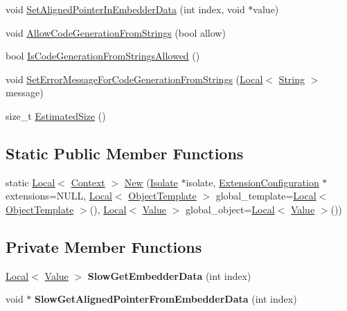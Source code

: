 \begin{DoxyCompactItemize}
void \hyperlink{classv8_1_1_context_a522063c88e4c2832f5ff4f3980815f58}{Set\+Aligned\+Pointer\+In\+Embedder\+Data} (int index, void $\ast$value)
\item 
void \hyperlink{classv8_1_1_context_a794ccc42113566f5d363f89c8b0d3c2c}{Allow\+Code\+Generation\+From\+Strings} (bool allow)
\item 
bool \hyperlink{classv8_1_1_context_aa7a960a232d232d1a2a904c2e6c18831}{Is\+Code\+Generation\+From\+Strings\+Allowed} ()
\item 
void \hyperlink{classv8_1_1_context_a8c919ccddb6fbb65602f7fe2587e8a34}{Set\+Error\+Message\+For\+Code\+Generation\+From\+Strings} (\hyperlink{classv8_1_1_local}{Local}$<$ \hyperlink{classv8_1_1_string}{String} $>$ message)
\item 
size\+\_\+t \hyperlink{classv8_1_1_context_abfec90cb6cb1cac58b4e3487515721a2}{Estimated\+Size} ()
\end{DoxyCompactItemize}
\subsection*{Static Public Member Functions}
\begin{DoxyCompactItemize}
\item 
static \hyperlink{classv8_1_1_local}{Local}$<$ \hyperlink{classv8_1_1_context}{Context} $>$ \hyperlink{classv8_1_1_context_a131c7bc130710ccbf739612868be6369}{New} (\hyperlink{classv8_1_1_isolate}{Isolate} $\ast$isolate, \hyperlink{classv8_1_1_extension_configuration}{Extension\+Configuration} $\ast$extensions=N\+U\+LL, \hyperlink{classv8_1_1_local}{Local}$<$ \hyperlink{classv8_1_1_object_template}{Object\+Template} $>$ global\+\_\+template=\hyperlink{classv8_1_1_local}{Local}$<$ \hyperlink{classv8_1_1_object_template}{Object\+Template} $>$(), \hyperlink{classv8_1_1_local}{Local}$<$ \hyperlink{classv8_1_1_value}{Value} $>$ global\+\_\+object=\hyperlink{classv8_1_1_local}{Local}$<$ \hyperlink{classv8_1_1_value}{Value} $>$())
\end{DoxyCompactItemize}
\subsection*{Private Member Functions}
\begin{DoxyCompactItemize}
\item 
\hyperlink{classv8_1_1_local}{Local}$<$ \hyperlink{classv8_1_1_value}{Value} $>$ {\bfseries Slow\+Get\+Embedder\+Data} (int index)\hypertarget{classv8_1_1_context_a68b8583bb76bcd7e27052beec926119a}{}\label{classv8_1_1_context_a68b8583bb76bcd7e27052beec926119a}

\item 
void $\ast$ {\bfseries Slow\+Get\+Aligned\+Pointer\+From\+Embedder\+Data} (int index)\hypertarget{classv8_1_1_context_a52e5a2050243616c5d7692b26e30f717}{}\label{classv8_1_1_context_a52e5a2050243616c5d7692b26e30f717}

\end{DoxyCompactItemize}
